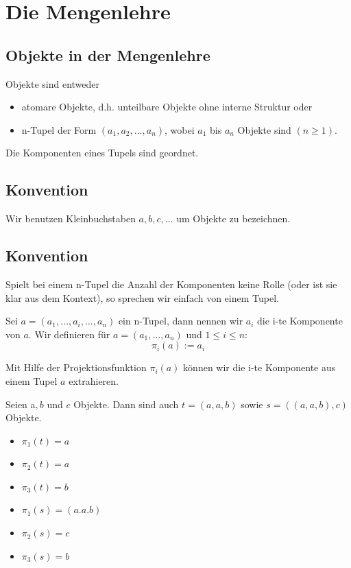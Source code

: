 \documentclass[../DatenbankenFS23.tex]{subfiles}
\begin{document}
\section{Die Mengenlehre}
\subsection{Objekte in der Mengenlehre}
Objekte sind entweder
\begin{itemize}
    \item atomare Objekte, d.h. unteilbare Objekte ohne interne Struktur oder 
    \item n-Tupel der Form $(a_1, a_2, \dots , a_n)$, wobei $a_1$ bis $a_n$ Objekte sind $(n\geq 1)$.
\end{itemize}
Die Komponenten eines Tupels sind geordnet.
\subsection*{Konvention}
Wir benutzen Kleinbuchstaben $a, b, c, \dots$ um Objekte zu bezeichnen.
\subsection*{Konvention}
Spielt bei einem n-Tupel die Anzahl der Komponenten keine Rolle (oder ist
sie klar aus dem Kontext), so sprechen wir einfach von einem Tupel.

\begin{defn}
Sei $a = (a_1, \dots , a_i, \dots , a_n)$ ein n-Tupel, dann nennen wir $a_i$ die i-te
Komponente von $a$.
Wir definieren f\"ur $a = (a_1, \dots , a_n)$ und $1 \leq i \leq n$:
\[\pi_i(a) := a_i\]

Mit Hilfe der Projektionsfunktion $\pi_i(a)$ k\"onnen wir die i-te Komponente
aus einem Tupel $a$ extrahieren.
\end{defn}

\begin{beispiel}
 Seien a$, b$ und $c$ Objekte. Dann sind auch
$t = (a, a, b)$ sowie $s = ((a, a, b), c)$
Objekte.
\begin{itemize}
    \item $\pi_1(t) = a$
    \item $\pi_2(t) = a$
    \item $\pi_3(t) = b$
    \item $\pi_1(s) = (a.a.b)$
    \item $\pi_2(s) = c$
    \item $\pi_3(s) = b$
\end{itemize}
\end{beispiel}
\end{document}
